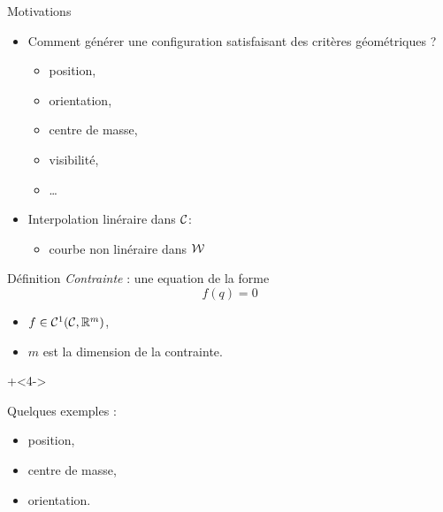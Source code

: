 
\begin{frame} {Motivations}
  \begin{itemize}
    \item Comment g\'en\'erer une configuration satisfaisant des crit\`eres g\'eom\'etriques ?
      \begin{itemize}
        \item position,
        \item orientation,
        \item centre de masse,
        \item visibilit\'e,
        \item \ldots
      \end{itemize}
      \pause
    \item Interpolation lin\'eraire dans ${\cal C}$:
      \begin{itemize}
        \item courbe non lin\'eraire dans ${\cal W}$
      \end{itemize}
      \pause
  \end{itemize}
\end{frame}

\begin{frame}[<+->]{D\'efinition}
  \emph{Contrainte} : une equation de la forme $$f(q) = 0$$
  \begin{itemize}
    \item<2-> $f \in \mathcal{C}^1({\cal C}, \mathbb{R}^m)$,
    \item<3-> $m$ est la dimension de la contrainte.
  \end{itemize}

  \onslide+<4->{
    Quelques exemples :
    \begin{itemize}
      \item<5-> position,
      \item<6-> centre de masse,
      \item<7-> orientation.
    \end{itemize}
  }
\end{frame}

